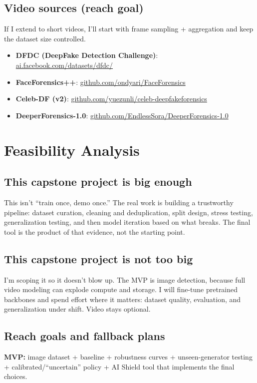 \documentclass[11pt]{article}
\begin{document}
\subsection*{Video sources (reach goal)}
If I extend to short videos, I’ll start with frame sampling + aggregation and keep the dataset size controlled.
\begin{itemize}[leftmargin=1.4em]
  \item \textbf{DFDC (DeepFake Detection Challenge)}: \href{https://ai.facebook.com/datasets/dfdc/}{ai.facebook.com/datasets/dfdc/}
  \item \textbf{FaceForensics++}: \href{https://github.com/ondyari/FaceForensics}{github.com/ondyari/FaceForensics}
  \item \textbf{Celeb-DF (v2)}: \href{https://github.com/yuezunli/celeb-deepfakeforensics}{github.com/yuezunli/celeb-deepfakeforensics}
  \item \textbf{DeeperForensics-1.0}: \href{https://github.com/EndlessSora/DeeperForensics-1.0}{github.com/EndlessSora/DeeperForensics-1.0}
\end{itemize}

\section{Feasibility Analysis}

\subsection{This capstone project is big enough}
This isn’t “train once, demo once.” The real work is building a trustworthy pipeline: dataset curation, cleaning and deduplication, split design, stress testing, generalization testing, and then model iteration based on what breaks. The final tool is the product of that evidence, not the starting point.

\subsection{This capstone project is not too big}
I’m scoping it so it doesn’t blow up. The MVP is image detection, because full video modeling can explode compute and storage. I will fine-tune pretrained backbones and spend effort where it matters: dataset quality, evaluation, and generalization under shift. Video stays optional.

\subsection{Reach goals and fallback plans}
\textbf{MVP:} image dataset + baseline + robustness curves + unseen-generator testing + calibrated/``uncertain'' policy + AI Shield tool that implements the final choices.
\end{document}
